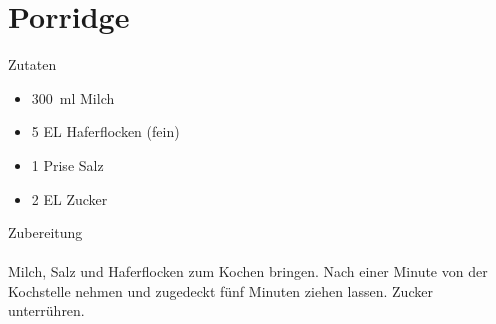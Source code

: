 \section*{Porridge}
\ihead{}\ohead{}
\cfoot{}
{\Large Zutaten}
\begin{itemize}
    \item \SI{300}{ml} Milch
    \item \num{5} EL Haferflocken (fein)
    \item \num{1} Prise Salz
    \item \num{2} EL Zucker
\end{itemize}
\noindent
{\Large Zubereitung}\\
\\
Milch, Salz und Haferflocken zum Kochen bringen.
Nach einer Minute von der Kochstelle nehmen und zugedeckt fünf Minuten ziehen lassen. 
Zucker unterrühren.
